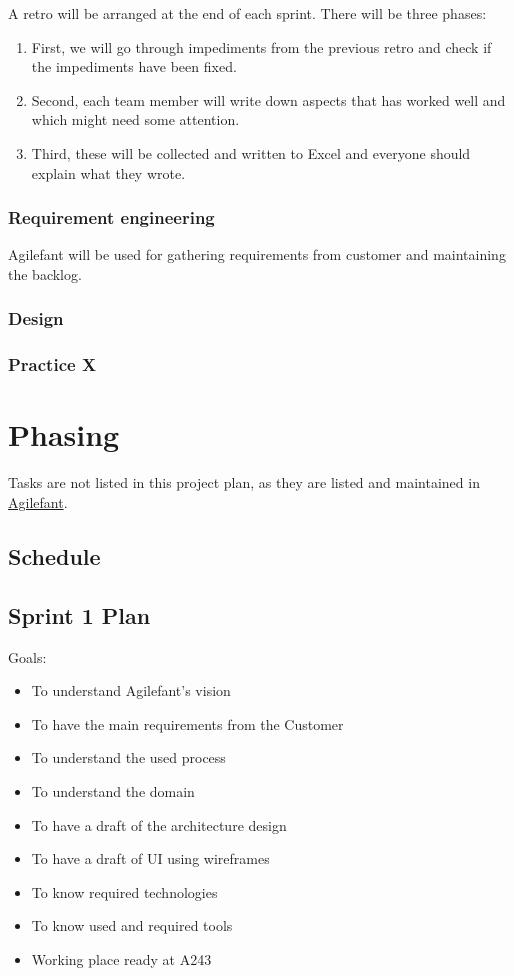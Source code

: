 A retro will be arranged at the end of each sprint. There will be three phases:

\begin{enumerate}
\item First, we will go through impediments from the previous 
retro and check if the impediments have been fixed.
\item Second, each team member will write down aspects that has 
worked well and which might need some attention.
\item Third, these will be collected and written to Excel and 
everyone should explain what they wrote.
\end{enumerate}

\subsubsection{Requirement engineering}

Agilefant will be used for gathering requirements from customer and maintaining 
the backlog. 

\subsubsection{Design}

\subsubsection{Practice X}

\section{Phasing}

Tasks are not listed in this project plan, as they are listed and maintained in 
\href{https://cloud.agilefant.com/dev/}{Agilefant}.

\subsection{Schedule}



\subsection{Sprint 1 Plan}

Goals:
\begin{itemize}
\item To understand Agilefant's vision
\item To have the main requirements from the Customer
\item To understand the used process
\item To understand the domain
\item To have a draft of the architecture design
\item To have a draft of UI using wireframes
\item To know required technologies
\item To know used and required tools
\item Working place ready at A243
\end{itemize}

